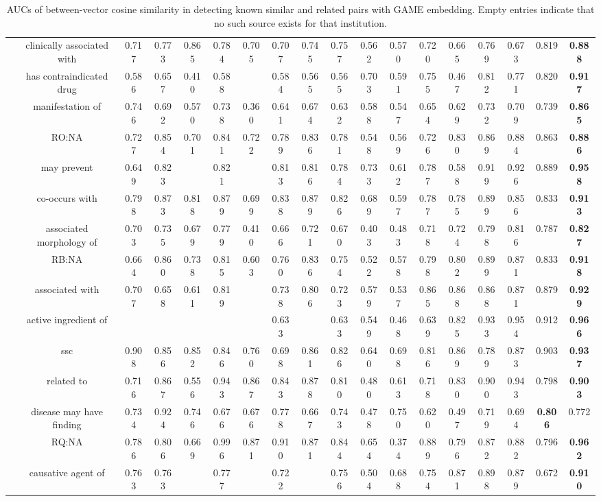 \documentclass{article}
\begin{document}
\begin{table}[H]
{\begin{tabular}{c|c|ccccccc|c|cccccccc}
 & clinically associated with & 0.717 & 0.773 & 0.865 & 0.784 & 0.705 & 0.707 & 0.745 & 0.757 & 0.562 & 0.570 & 0.720 & 0.665 & 0.769 & 0.673 & 0.819 & \textbf{0.888} \\
 & has contraindicated drug & 0.586 & 0.657 & 0.410 & 0.588 & & 0.584 & 0.565 & 0.565 & 0.703 & 0.591 & 0.755 & 0.467 & 0.812 & 0.771 & 0.820 & \textbf{0.917} \\
 & manifestation of & 0.746 & 0.692 & 0.570 & 0.738 & 0.360 & 0.641 & 0.674 & 0.632 & 0.588 & 0.547 & 0.654 & 0.629 & 0.732 & 0.709 & 0.739 & \textbf{0.865} \\
 & RO:NA & 0.727 & 0.854 & 0.701 & 0.841 & 0.722 & 0.789 & 0.836 &  0.781 & 0.548 & 0.569 & 0.726 & 0.830 & 0.869 & 0.884 & 0.863 & \textbf{0.886} \\
 & may prevent & 0.649 & 0.823 & & 0.821 & & 0.813 & 0.816 & 0.784& 0.733 & 0.612 & 0.787 & 0.588 & 0.919 & 0.926 & 0.889 & \textbf{0.958} \\
 & co-occurs with & 0.798 & 0.873 & 0.818 & 0.879 & 0.699 & 0.838 & 0.879 & 0.826& 0.689 & 0.597 & 0.787 & 0.785 & 0.899 & 0.856 & 0.833 & \textbf{0.913} \\
 & associated morphology of & 0.703 & 0.735 & 0.679 & 0.779 & 0.410 & 0.666 & 0.721 & 0.670& 0.403 & 0.483 & 0.718 & 0.724 & 0.798 & 0.816 & 0.787 & \textbf{0.827} \\
 & RB:NA & 0.664 & 0.860 & 0.738 & 0.815 & 0.603 & 0.760 & 0.836 & 0.754 & 0.522 & 0.578 & 0.798 & 0.802 & 0.899 & 0.871 & 0.833 & \textbf{0.918} \\
 & associated with & 0.707 & 0.658 & 0.611 & 0.819 & & 0.738 & 0.806 & 0.723 & 0.579 & 0.537 & 0.865 & 0.868 & 0.868 & 0.871 & 0.879 & \textbf{0.929} \\
 & active ingredient of & & & & & & 0.633 & & 0.633 & 0.549 & 0.468 & 0.639 & 0.825 & 0.933 & 0.954 & 0.912 & \textbf{0.966} \\
 & ssc & 0.908 & 0.856 & 0.852 & 0.846 & 0.760 & 0.698 & 0.861 & 0.826 & 0.640 & 0.698 & 0.816 & 0.869 & 0.789 & 0.873 & 0.903 & \textbf{0.937} \\
 & related to & 0.716 & 0.867 & 0.556 & 0.943 & 0.867 & 0.843 & 0.878 & 0.810 & 0.480 & 0.613 & 0.718 & 0.830 & 0.900 & 0.943 & 0.798 & \textbf{0.903} \\
 & disease may have finding & 0.734 & 0.924 & 0.746 & 0.676 & 0.676 & 0.778 & 0.667 & 0.743 & 0.478 & 0.750 & 0.620 & 0.497 & 0.719 & 0.694 & \textbf{0.806} & 0.772 \\
 & RQ:NA & 0.786 & 0.806 & 0.669 & 0.996 & 0.871 & 0.910 & 0.871 & 0.844 & 0.654 & 0.374 & 0.889 & 0.796 & 0.872 & 0.882 & 0.796 & \textbf{0.962} \\
 & causative agent of & 0.763 & 0.763 & & 0.777 & & 0.722 & & 0.756 & 0.504 & 0.688 & 0.754 & 0.871 & 0.898 & 0.879 & 0.672 & \textbf{0.910} \\
\hline
\end{tabular}
}
\caption{AUCs of between-vector cosine similarity in detecting known similar and related pairs with GAME embedding. Empty entries indicate that no such source exists for that institution. }
\label{R_sim}
\end{table}
\end{document}
